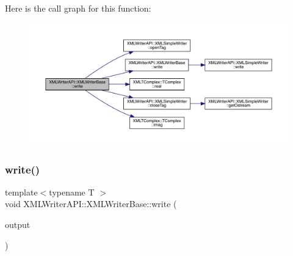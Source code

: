 Here is the call graph for this function\+:
\nopagebreak
\begin{figure}[H]
\begin{center}
\leavevmode
\includegraphics[width=350pt]{d5/df5/classXMLWriterAPI_1_1XMLWriterBase_a00b5edcaf39f8bdaf2aa5eed7118c8e7_cgraph}
\end{center}
\end{figure}
\mbox{\label{classXMLWriterAPI_1_1XMLWriterBase_a00b5edcaf39f8bdaf2aa5eed7118c8e7}} 
\subsubsection{\texorpdfstring{write()}{write()}\hspace{0.1cm}{\footnotesize\ttfamily [22/26]}}
{\footnotesize\ttfamily template$<$typename T $>$ \\
void X\+M\+L\+Writer\+A\+P\+I\+::\+X\+M\+L\+Writer\+Base\+::write (\begin{DoxyParamCaption}\item[{\mbox{\hyperlink{classXMLTComplex_1_1TComplex}{T\+Complex}}$<$ T $>$ \&}]{output }\end{DoxyParamCaption})\hspace{0.3cm}{\ttfamily [inline]}}

